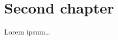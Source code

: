 \chapter{Second chapter}

Lorem ipsum\ldots

\label{exponent-format}
\label{mantissa-format}
\label{opt:be}
\label{range-tracking}
\label{unnorm-math}
